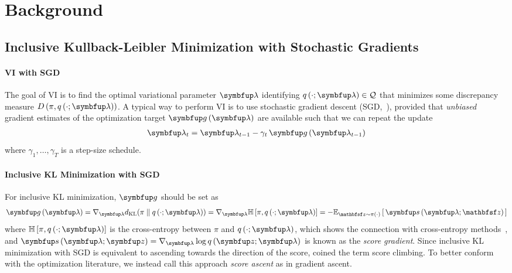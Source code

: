 
\section{Background}
\vspace{-0.05in}
\subsection{Inclusive Kullback-Leibler Minimization with Stochastic Gradients}\label{section:ivi_previous}
\vspace{-0.05in}
\paragraph{VI with SGD}
The goal of VI is to find the optimal variational parameter \(\vlambda\) identifying \(q\left(\cdot; \vlambda\right) \in \mathcal{Q}\) that minimizes some discrepancy measure \(D\left(\pi, q\left(\cdot; \vlambda\right)\right)\).
A typical way to perform VI is to use stochastic gradient descent (SGD,~\citealt{robbins_stochastic_1951}), provided that \textit{unbiased} gradient estimates of the optimization target \(\vg\,(\vlambda)\) are available such that we can repeat the update
{%
\begin{align*}
  \vlambda_{t} = \vlambda_{t-1} - \gamma_{t} \, \vg\left(\vlambda_{t-1}\right)
\end{align*}
}%
where \(\gamma_1, \ldots, \gamma_T\) is a step-size schedule.

\paragraph{Inclusive KL Minimization with SGD}
For inclusive KL minimization, \(\vg\) should be set as
%
{%
\begin{align*}
  \vg\left(\vlambda\right)
  = \nabla_{\vlambda} \DKL{\pi}{q\left(\cdot; \vlambda\right)}
  = \nabla_{\vlambda} \mathbb{H}\left[\pi, q\left(\cdot; \vlambda\right)\right]
  = -\Esub{\rvvz \sim \pi\left(\cdot\right)}{ \vs\,(\vlambda; \rvvz) } 
\end{align*}
}%
%
where \(\mathbb{H}\left[\pi, q\left(\cdot; \vlambda\right)\right]\) is the cross-entropy between \(\pi\) and \(q\left(\cdot; \vlambda\right)\), which shows the connection with cross-entropy methods~\citep{deboer_tutorial_2005}, and \(\vs\,(\vlambda;\vz) = \nabla_{\vlambda} \log q\,(\vz; \vlambda)\) is known as the \textit{score gradient}.
Since inclusive KL minimization with SGD is equivalent to ascending towards the direction of the score, \citet{NEURIPS2020_b2070693} coined the term score climbing.
To better conform with the optimization literature, we instead call this approach \textit{score ascent} as in gradient ascent.

